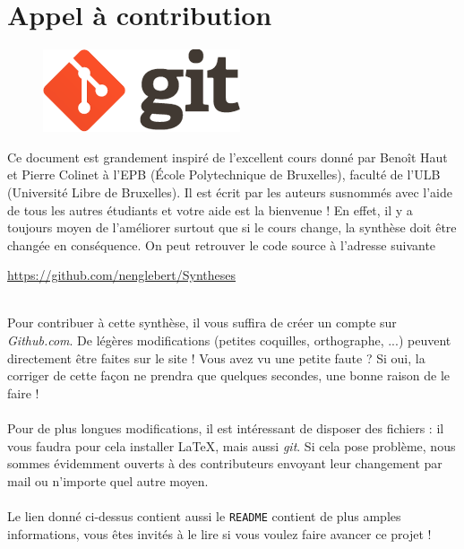 \chapter*{Appel à contribution}
\begin{figure}
	\includegraphics[scale=0.5]{git.png}
\end{figure}
Ce document est grandement inspiré de l’excellent cours donné 
par Benoît Haut et Pierre Colinet à l’EPB (École Polytechnique de Bruxelles), faculté de l’ULB (Université 
Libre de Bruxelles). Il est écrit par les auteurs susnommés avec l’aide de tous les autres étudiants 
et votre aide est la bienvenue ! En effet, il y a toujours moyen de l’améliorer surtout que si le 
cours change, la synthèse doit être changée en conséquence. On peut retrouver le code source à l’adresse 
suivante
\begin{center}
	\url{https://github.com/nenglebert/Syntheses}
\end{center}\ \\
Pour contribuer à cette synthèse, il vous suffira de créer un compte sur \textit{Github.com}. De
légères modifications (petites coquilles, orthographe, ...) peuvent directement être faites sur le
site ! Vous avez vu une petite faute ? Si oui, la corriger de cette façon ne prendra que quelques 
secondes, une bonne raison de le faire ! \\
\\
Pour de plus longues modifications, il est intéressant de disposer des fichiers : il vous 
faudra pour cela installer \LaTeX, mais aussi \textit{git}. Si cela pose problème, nous sommes 
évidemment ouverts à des contributeurs envoyant leur changement par mail ou n’importe quel autre 
moyen.\\
\\
Le lien donné ci-dessus contient aussi le \texttt{README} contient de plus amples informations, 
vous êtes invités à le lire si vous voulez faire avancer ce projet ! 

